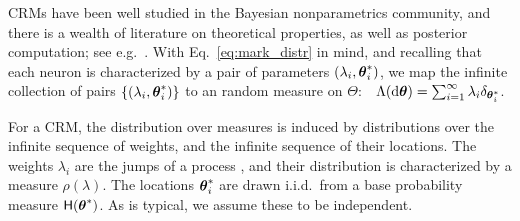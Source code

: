 CRMs have been well studied in the Bayesian nonparametrics community, and there is a wealth of literature on
theoretical properties, as well as posterior computation; see e.g.\ \citep{JamesLP09, Hjo1990, ThiJor2007}. 
With Eq.~\eqref{eq:mark_distr} in mind, and recalling that each neuron is characterized by a pair of parameters $(\lambda_i, \boldsymbol{\theta}^*_i)$,
we map the infinite collection of pairs $\{(\lambda_i, \boldsymbol{\theta}^*_i)\}$ to an random measure on $\Theta$:
$\ \  \Lambda(\mathrm{d} \boldsymbol{\theta}) = \sum_{i=1}^{\infty} \lambda_i \delta_{\boldsymbol{\theta}^*_i}$.

For a CRM, the distribution over measures is induced by distributions
over the infinite sequence of weights, and the infinite sequence of their locations. 
The weights $\lambda_i$ are the jumps of a \Levy process \citep{Sato90}, and their distribution is characterized by a 
\Levy measure $\rho(\lambda)$. The locations $\boldsymbol{\theta}^*_i$ are drawn i.i.d.\  from a base probability measure $\mathsf{H}(\boldsymbol{\theta}^*)$.
As is typical, we assume these to be independent. %

